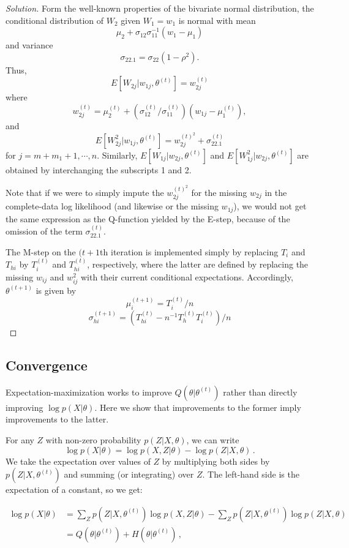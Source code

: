 \documentclass[11pt]{article}
\begin{document}
\begin{proof}[Solution]
Form the well-known properties of the bivariate normal distribution, the conditional distribution of $W_2$ given $W_1=w_1$ is normal with mean
$$
\mu_2 + \sigma_{12}\sigma_{11}^{-1}(w_1-\mu_1)
$$
and variance
$$
\sigma_{22.1} = \sigma_{22}(1-\rho^2).
$$
Thus, 
$$
E[W_{2j} | w_{1j}, \theta^{(t)}] = w_{2j}^{(t)}
$$
where
$$
w_{2j}^{(t)} = \mu_2^{(t)} + (\sigma_{12}^{(t)}/\sigma_{11}^{(t)})(w_{1j}-\mu_1^{(t)}),
$$
and 
$$
E[W^2_{2j} | w_{1j}, \theta^{(t)}] = w_{2j}^{(t)^2} + \sigma_{22.1}^{(t)}
$$
for $j=m+m_1+1, \cdots, n$. Similarly, $E[W_{1j} | w_{2j}, \theta^{(t)}]$ and $E[W^2_{1j} | w_{2j}, \theta^{(t)}]$ are obtained by interchanging the subscripts 1 and 2.

Note that if we were to simply impute the $w_{2j}^{(t)^2}$ for the missing $w_{2j}$ in the complete-data log likelihood (and likewise or the missing $w_{1j}$), we would not get the same expression as the Q-function yielded by the E-step, because of the omission of the term $\sigma_{22.1}^{(t)}$.

The M-step on the $(t+1$th iteration is implemented simply by replacing $T_i$ and $T_{hi}$ by $T_i^{(t)}$ and $T_{hi}^{(t)}$, respectively, where the latter are defined by replacing the missing $w_{ij}$ and $w_{ij}^2$ with their current conditional expectations. Accordingly, $\theta^{(t+1)}$ is given by
$$
\mu_i^{(t+1)} = T_i^{(t)}/n
$$
$$
\sigma_{hi}^{(t+1)} = (T_{hi}^{(t)} - n^{-1}T_h^{(t)}T_i^{(t)})/n
$$
\end{proof}
\subsection{Convergence}
Expectation-maximization works to improve $Q(\theta|\theta^{(t)})$ rather than directly improving $\log p({X}|\theta).$ Here we show that improvements to the former imply improvements to the latter.

For any ${Z}$ with non-zero probability $p({Z}|{X},\theta)$, we can write
$$
        \log p({X}|\theta) = \log p({X},{Z}|\theta) - \log p({Z}|{X},\theta) \,. 
$$
We take the expectation over values of ${Z}$ by multiplying both sides by $p({Z}|{X},\theta^{(t)})$ and summing (or integrating) over ${Z}$. The left-hand side is the expectation of a constant, so we get:

        \begin{align*} \log p({X}|\theta) & = \sum_{{Z}} p({Z}|{X},\theta^{(t)}) \log p({X},{Z}|\theta) - \sum_{{Z}} p({Z}|{X},\theta^{(t)}) \log p({Z}|{X},\theta) \\ & = Q(\theta|\theta^{(t)}) + H(\theta|\theta^{(t)}) \,, \end{align*} 
\end{document}
